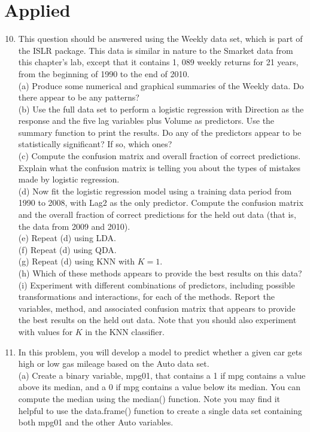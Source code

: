 \documentclass[10pt]{article}
\begin{document}
\section*{Applied}
\begin{enumerate}
  \setcounter{enumi}{9}
  \item This question should be answered using the Weekly data set, which is part of the ISLR package. This data is similar in nature to the Smarket data from this chapter's lab, except that it contains 1, 089 weekly returns for 21 years, from the beginning of 1990 to the end of 2010.\\
(a) Produce some numerical and graphical summaries of the Weekly data. Do there appear to be any patterns?\\
(b) Use the full data set to perform a logistic regression with Direction as the response and the five lag variables plus Volume as predictors. Use the summary function to print the results. Do any of the predictors appear to be statistically significant? If so, which ones?\\
(c) Compute the confusion matrix and overall fraction of correct predictions. Explain what the confusion matrix is telling you about the types of mistakes made by logistic regression.\\
(d) Now fit the logistic regression model using a training data period from 1990 to 2008, with Lag2 as the only predictor. Compute the confusion matrix and the overall fraction of correct predictions for the held out data (that is, the data from 2009 and 2010).\\
(e) Repeat (d) using LDA.\\
(f) Repeat (d) using QDA.\\
(g) Repeat (d) using KNN with $K=1$.\\
(h) Which of these methods appears to provide the best results on this data?\\
(i) Experiment with different combinations of predictors, including possible transformations and interactions, for each of the methods. Report the variables, method, and associated confusion matrix that appears to provide the best results on the held out data. Note that you should also experiment with values for $K$ in the KNN classifier.
  \item In this problem, you will develop a model to predict whether a given car gets high or low gas mileage based on the Auto data set.\\
(a) Create a binary variable, mpg01, that contains a 1 if mpg contains a value above its median, and a 0 if mpg contains a value below its median. You can compute the median using the median() function. Note you may find it helpful to use the data.frame() function to create a single data set containing both mpg01 and the other Auto variables.\\

\end{enumerate}
\end{document}
